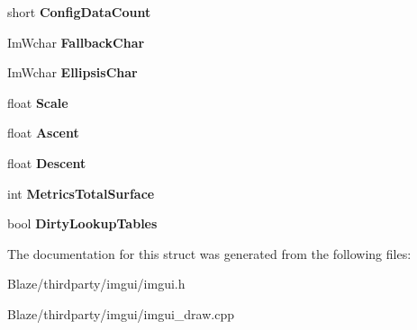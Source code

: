 \begin{DoxyCompactItemize}
short {\bfseries Config\+Data\+Count}
\item 
\mbox{\label{structImFont_ae54c2c4184bfcbc7b8f6da9cbc4f93c0}} 
Im\+Wchar {\bfseries Fallback\+Char}
\item 
\mbox{\label{structImFont_a51df9d341917235207db60e775b11621}} 
Im\+Wchar {\bfseries Ellipsis\+Char}
\item 
\mbox{\label{structImFont_ae98fb07fd8862a7243d77b11f38bba19}} 
float {\bfseries Scale}
\item 
\mbox{\label{structImFont_a5238ef18f8ad02b783fb8b3a195b708e}} 
float {\bfseries Ascent}
\item 
\mbox{\label{structImFont_abcca12aa908bf7105433e7db6088a5e5}} 
float {\bfseries Descent}
\item 
\mbox{\label{structImFont_a8087b2ee8b27dcf5c6e30a8318f87cc7}} 
int {\bfseries Metrics\+Total\+Surface}
\item 
\mbox{\label{structImFont_a3858e851f69b3abbbefad76030a546ff}} 
bool {\bfseries Dirty\+Lookup\+Tables}
\end{DoxyCompactItemize}


The documentation for this struct was generated from the following files\+:\begin{DoxyCompactItemize}
\item 
Blaze/thirdparty/imgui/imgui.\+h\item 
Blaze/thirdparty/imgui/imgui\+\_\+draw.\+cpp\end{DoxyCompactItemize}
